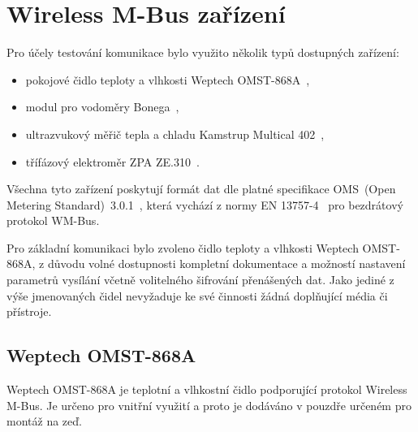 \chapter{Wireless M-Bus zařízení}
\label{ChapterZarizeni}

Pro účely testování komunikace bylo využito několik typů dostupných zařízení:
\begin{itemize}
	\item pokojové čidlo teploty a vlhkosti Weptech OMST-868A~\cite{CidloWeptech},
	\item modul pro vodoměry Bonega~\cite{CidloBonega},
	\item ultrazvukový měřič tepla a chladu Kamstrup Multical 402~\cite{CidloKamstrup},
	\item třífázový elektroměr ZPA ZE.310~\cite{CidloZpa}.
\end{itemize}

Všechna tyto zařízení poskytují formát dat dle platné specifikace OMS~(Open Metering Standard)~3.0.1~\cite{NormaOMS}, která vychází z normy EN 13757-4~\cite{Norma4} pro bezdrátový protokol WM-Bus.

Pro základní komunikaci bylo zvoleno čidlo teploty a vlhkosti Weptech OMST-868A, z důvodu volné dostupnosti kompletní dokumentace a možností nastavení parametrů vysílání včetně volitelného šifrování přenášených dat. Jako jediné z výše jmenovaných čidel nevyžaduje ke své činnosti žádná doplňující média či přístroje.
	
	
	
	\section{Weptech OMST-868A}
	
	Weptech OMST-868A je teplotní a vlhkostní čidlo podporující protokol Wireless M-Bus. Je určeno pro vnitřní využití a proto je dodáváno v pouzdře určeném pro montáž na zeď.
	
	

